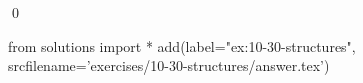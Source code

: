 
\begin{ex}
  \label{ex:10-30-structures}
  
  \qed
\end{ex}
\begin{python0}
from solutions import *
add(label="ex:10-30-structures",
    srcfilename='exercises/10-30-structures/answer.tex')
\end{python0}

